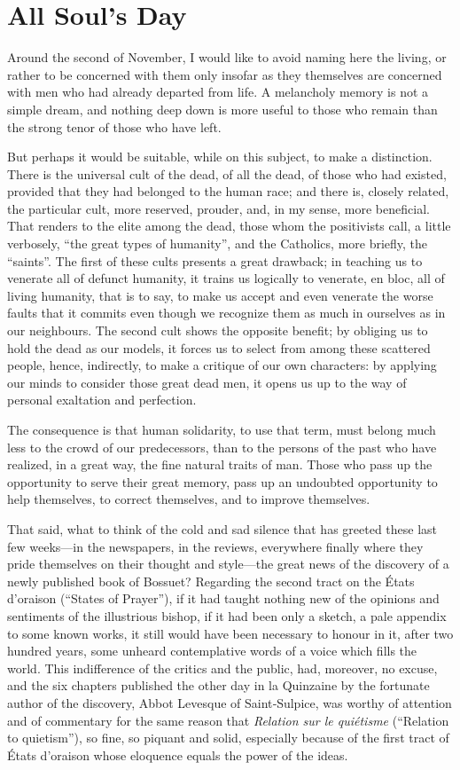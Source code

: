 \section{All Soul's Day}

Around the second of November, I would like to avoid naming here the living, or rather to be concerned with them only insofar as they themselves are concerned with men who had already departed from life. A melancholy memory is not a simple dream, and nothing deep down is more useful to those who remain than the strong tenor of those who have left.

But perhaps it would be suitable, while on this subject, to make a distinction. There is the universal cult of the dead, of all the dead, of those who had existed, provided that they had belonged to the human race; and there is, closely related, the particular cult, more reserved, prouder, and, in my sense, more beneficial. That renders to the elite among the dead, those whom the positivists call, a little verbosely, “the great types of humanity”, and the Catholics, more briefly, the “saints”. The first of these cults presents a great drawback; in teaching us to venerate all of defunct humanity, it trains us logically to venerate, en bloc, all of living humanity, that is to say, to make us accept and even venerate the worse faults that it commits even though we recognize them as much in ourselves as in our neighbours. The second cult shows the opposite benefit; by obliging us to hold the dead as our models, it forces us to select from among these scattered people, hence, indirectly, to make a critique of our own characters: by applying our minds to consider those great dead men, it opens us up to the way of personal exaltation and perfection.

The consequence is that human solidarity, to use that term, must belong much less to the crowd of our predecessors, than to the persons of the past who have realized, in a great way, the fine natural traits of man. Those who pass up the opportunity to serve their great memory, pass up an undoubted opportunity to help themselves, to correct themselves, and to improve themselves.

That said, what to think of the cold and sad silence that has greeted these last few weeks—in the newspapers, in the reviews, everywhere finally where they pride themselves on their thought and style—the great news of the discovery of a newly published book of Bossuet? Regarding the second tract on the États d’oraison (“States of Prayer”), if it had taught nothing new of the opinions and sentiments of the illustrious bishop, if it had been only a sketch, a pale appendix to some known works, it still would have been necessary to honour in it, after two hundred years, some unheard contemplative words of a voice which fills the world. This indifference of the critics and the public, had, moreover, no excuse, and the six chapters published the other day in la Quinzaine by the fortunate author of the discovery, Abbot Levesque of Saint‐Sulpice, was worthy of attention and of commentary for the same reason that \textit{Relation sur le quiétisme} (``Relation to quietism''), so fine, so piquant and solid, especially because of the first tract of États d’oraison whose eloquence equals the power of the ideas.

